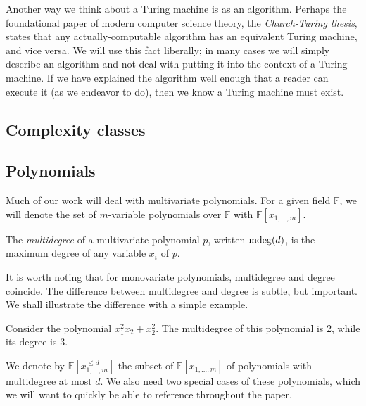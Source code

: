 Another way we think about a Turing machine is as an algorithm. Perhaps the
foundational paper of modern computer science theory, the \emph{Church-Turing
  thesis}, states that any actually-computable algorithm has an equivalent
Turing machine, and vice versa. We will use this fact liberally; in many cases
we will simply describe an algorithm and not deal with putting it into the
context of a Turing machine. If we have explained the algorithm well enough that
a reader can execute it (as we endeavor to do), then we know a Turing machine
must exist.


\subsection{Complexity classes}


\subsection{Polynomials}

Much of our work will deal with multivariate polynomials. For a given field
$\mathbb{F}$, we will denote the set of $m$-variable polynomials over
$\mathbb{F}$ with $\mathbb{F}[x_{1, \ldots, m}]$.

\begin{defn}[{\cite[8]{AW09}}]\label{def:mdeg}
  The \emph{multidegree} of a multivariate polynomial $p$, written $\operatorname{mdeg}(d)$,
  is the maximum degree of any variable $x_{i}$ of $p$.
\end{defn}

It is worth noting that for monovariate polynomials, multidegree and degree
coincide. The difference between multidegree and degree is subtle, but
important. We shall illustrate the difference with a simple example.

\begin{example}
  Consider the polynomial $x_{1}^{2}x_{2} + x_{2}^{2}$. The multidegree of this
  polynomial is 2, while its degree is 3.
\end{example}

We denote by $\mathbb{F}[x_{1, \ldots, m}^{\le d}]$ the subset of
$\mathbb{F}[x_{1, \ldots, m}]$ of polynomials with multidegree at most $d$. We also
need two special cases of these polynomials, which we will want to quickly be
able to reference throughout the paper.

